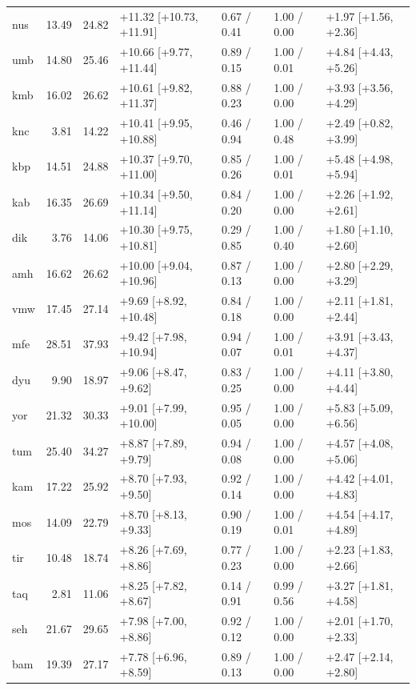 {\begin{longtable}{@{}lrrllll@{}}
nus & 13.49 & 24.82 & +11.32 [+10.73, +11.91] & 0.67 / 0.41 & 1.00 / 0.00 & +1.97 [+1.56, +2.36] \\
umb & 14.80 & 25.46 & +10.66 [+9.77, +11.44] & 0.89 / 0.15 & 1.00 / 0.01 & +4.84 [+4.43, +5.26] \\
kmb & 16.02 & 26.62 & +10.61 [+9.82, +11.37] & 0.88 / 0.23 & 1.00 / 0.00 & +3.93 [+3.56, +4.29] \\
knc & 3.81 & 14.22 & +10.41 [+9.95, +10.88] & 0.46 / 0.94 & 1.00 / 0.48 & +2.49 [+0.82, +3.99] \\
kbp & 14.51 & 24.88 & +10.37 [+9.70, +11.00] & 0.85 / 0.26 & 1.00 / 0.01 & +5.48 [+4.98, +5.94] \\
kab & 16.35 & 26.69 & +10.34 [+9.50, +11.14] & 0.84 / 0.20 & 1.00 / 0.00 & +2.26 [+1.92, +2.61] \\
dik & 3.76 & 14.06 & +10.30 [+9.75, +10.81] & 0.29 / 0.85 & 1.00 / 0.40 & +1.80 [+1.10, +2.60] \\
amh & 16.62 & 26.62 & +10.00 [+9.04, +10.96] & 0.87 / 0.13 & 1.00 / 0.00 & +2.80 [+2.29, +3.29] \\
vmw & 17.45 & 27.14 & +9.69 [+8.92, +10.48] & 0.84 / 0.18 & 1.00 / 0.00 & +2.11 [+1.81, +2.44] \\
mfe & 28.51 & 37.93 & +9.42 [+7.98, +10.94] & 0.94 / 0.07 & 1.00 / 0.01 & +3.91 [+3.43, +4.37] \\
dyu & 9.90 & 18.97 & +9.06 [+8.47, +9.62] & 0.83 / 0.25 & 1.00 / 0.00 & +4.11 [+3.80, +4.44] \\
yor & 21.32 & 30.33 & +9.01 [+7.99, +10.00] & 0.95 / 0.05 & 1.00 / 0.00 & +5.83 [+5.09, +6.56] \\
tum & 25.40 & 34.27 & +8.87 [+7.89, +9.79] & 0.94 / 0.08 & 1.00 / 0.00 & +4.57 [+4.08, +5.06] \\
kam & 17.22 & 25.92 & +8.70 [+7.93, +9.50] & 0.92 / 0.14 & 1.00 / 0.00 & +4.42 [+4.01, +4.83] \\
mos & 14.09 & 22.79 & +8.70 [+8.13, +9.33] & 0.90 / 0.19 & 1.00 / 0.01 & +4.54 [+4.17, +4.89] \\
tir & 10.48 & 18.74 & +8.26 [+7.69, +8.86] & 0.77 / 0.23 & 1.00 / 0.00 & +2.23 [+1.83, +2.66] \\
taq & 2.81 & 11.06 & +8.25 [+7.82, +8.67] & 0.14 / 0.91 & 0.99 / 0.56 & +3.27 [+1.81, +4.58] \\
seh & 21.67 & 29.65 & +7.98 [+7.00, +8.86] & 0.92 / 0.12 & 1.00 / 0.00 & +2.01 [+1.70, +2.33] \\
bam & 19.39 & 27.17 & +7.78 [+6.96, +8.59] & 0.89 / 0.13 & 1.00 / 0.00 & +2.47 [+2.14, +2.80] \\

\end{longtable}}
